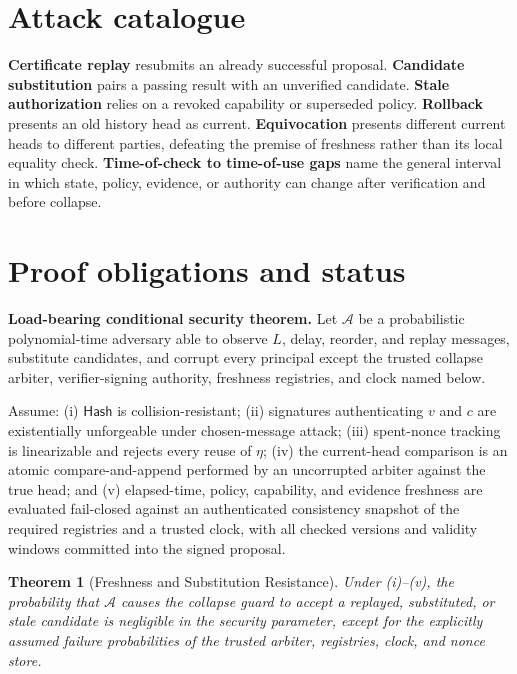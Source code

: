 \documentclass[11pt,openany]{book}
\newtheorem{theorem}[definition]{Theorem}
\newcommand{\Hash}{\mathsf{Hash}}
\begin{document}
\section{Attack catalogue}

\textbf{Certificate replay} resubmits an already successful proposal.
\textbf{Candidate substitution} pairs a passing result with an unverified
candidate. \textbf{Stale authorization} relies on a revoked capability or
superseded policy. \textbf{Rollback} presents an old history head as current.
\textbf{Equivocation} presents different current heads to different parties,
defeating the premise of freshness rather than its local equality check.
\textbf{Time-of-check to time-of-use gaps} name the general interval in which
state, policy, evidence, or authority can change after verification and before
collapse.

\section{Proof obligations and status}

\textbf{Load-bearing conditional security theorem.} Let \(\mathcal A\) be a
probabilistic polynomial-time adversary able to observe \(L\), delay, reorder,
and replay messages, substitute candidates, and corrupt every principal except
the trusted collapse arbiter, verifier-signing authority, freshness registries,
and clock named below.

Assume: (i) \(\Hash\) is collision-resistant; (ii) signatures authenticating
\(v\) and \(c\) are existentially unforgeable under chosen-message attack;
(iii) spent-nonce tracking is linearizable and rejects every reuse of \(\eta\);
(iv) the current-head comparison is an atomic compare-and-append performed by
an uncorrupted arbiter against the true head; and (v) elapsed-time, policy,
capability, and evidence freshness are evaluated fail-closed against an
authenticated consistency snapshot of the required registries and a trusted
clock, with all checked versions and validity windows committed into the signed
proposal.

\begin{theorem}[Freshness and Substitution Resistance]
Under (i)--(v), the probability that \(\mathcal A\) causes the collapse guard
to accept a replayed, substituted, or stale candidate is negligible in the
security parameter, except for the explicitly assumed failure probabilities of
the trusted arbiter, registries, clock, and nonce store.
\end{theorem}
\end{document}
